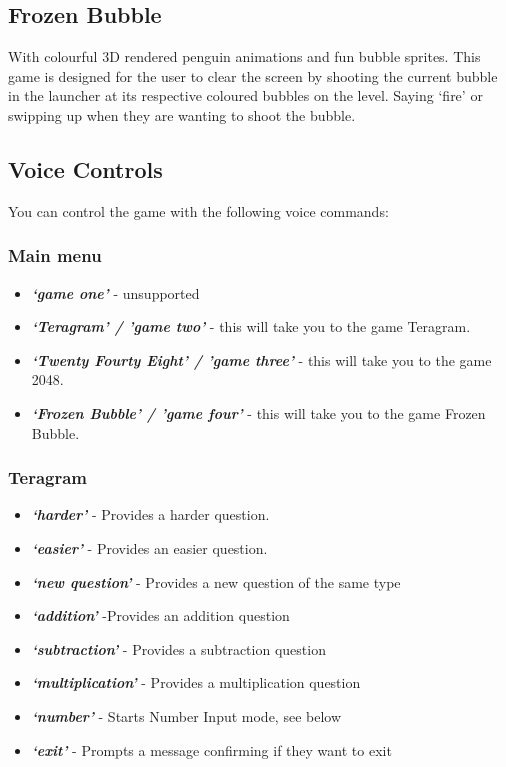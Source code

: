 \documentclass[11pt, oneside]{article}
\begin{document}
\subsection{Frozen Bubble}
With colourful 3D rendered penguin animations and fun bubble sprites. 
This game is designed for the user to clear the screen by shooting the 
current bubble in the launcher at its respective coloured bubbles on 
the level. Saying `fire' or swipping up when they are wanting to shoot
the bubble.  

\subsection{Voice Controls}

You can control the game with the following voice commands:

\subsubsection{Main menu}

\begin{itemize}
  \item {\em\bf`game one'} - unsupported
  \item {\em\bf`Teragram' / 'game two'}  - this will take you to the game Teragram.
  \item {\em\bf`Twenty Fourty Eight' / 'game three'} - this will take you to the game 2048.
  \item {\em\bf`Frozen Bubble' / 'game four'} - this will take you to the game Frozen Bubble.
\end{itemize}

\subsubsection{Teragram}

\begin{itemize}
  \item {\em\bf`harder'} - Provides a harder question. 
  \item {\em\bf`easier'} - Provides an easier question.
  \item {\em\bf`new question'} - Provides a new question of the same type
  \item {\em\bf`addition'} -Provides an addition question
  \item {\em\bf`subtraction'} - Provides a subtraction question
  \item {\em\bf`multiplication'} - Provides a multiplication question 
  \item {\em\bf`number'} - Starts Number Input mode, see below
  \item {\em\bf`exit'} - Prompts a message confirming if they want to exit
 
\end{itemize}
\end{document}
